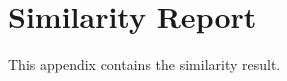 %
%
%                 

\chapter{Similarity Report}
\label{sec:appendixx}

This appendix contains the similarity result. 

